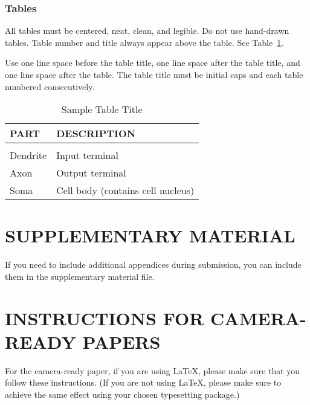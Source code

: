 \documentclass[twoside]{article}
\begin{document}
\subsubsection{Tables}

All tables must be centered, neat, clean, and legible. Do not use hand-drawn tables.
Table number and title always appear above the table.
See Table~\ref{sample-table}.

Use one line space before the table title, one line space after the table title,
and one line space after the table. The table title must be
initial caps and each table numbered consecutively.

\begin{table}[h]
\caption{Sample Table Title} \label{sample-table}
\begin{center}
\begin{tabular}{ll}
\textbf{PART}  &\textbf{DESCRIPTION} \\
\hline \\
Dendrite         &Input terminal \\
Axon             &Output terminal \\
Soma             &Cell body (contains cell nucleus) \\
\end{tabular}
\end{center}
\end{table}

\section{SUPPLEMENTARY MATERIAL}

If you need to include additional appendices during submission, you
can include them in the supplementary material file.



\section{INSTRUCTIONS FOR CAMERA-READY PAPERS}

For the camera-ready paper, if you are using \LaTeX, please make sure
that you follow these instructions.  (If you are not using \LaTeX,
please make sure to achieve the same effect using your chosen
typesetting package.)
\end{document}
